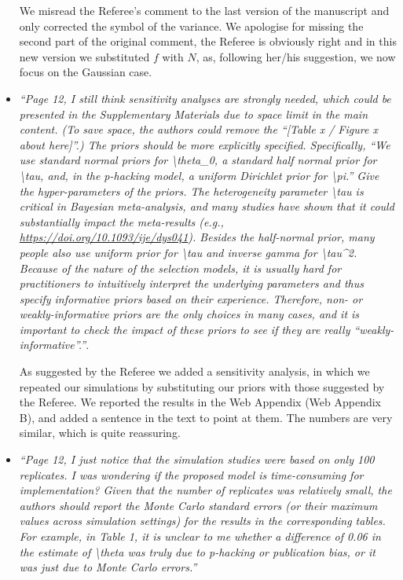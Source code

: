 \documentclass[11pt]{article}
\begin{document}
\begin{itemize}
We misread the Referee's comment to the last version of the manuscript and only corrected the symbol of the variance. We apologise for missing the second part of the original comment, the Referee is obviously right and in this new version we substituted $f$ with $N$, as, following her/his suggestion, we now focus on the Gaussian case.\\


\item \emph{``Page 12, I still think sensitivity analyses are strongly needed, which could be presented in the Supplementary Materials due to space limit in the main content. (To save space, the authors could remove the ``[Table x / Figure x about here]''.) The priors should be more explicitly specified. Specifically, ``We use standard normal priors for \textbackslash theta\_0, a standard half normal prior for \textbackslash tau, and, in the p-hacking model, a uniform Dirichlet prior for \textbackslash pi.'' Give the hyper-parameters of the priors. The heterogeneity parameter \textbackslash tau is critical in Bayesian meta-analysis, and many studies have shown that it could substantially impact the meta-results (e.g., \url{https://doi.org/10.1093/ije/dys041}). Besides the half-normal prior, many people also use uniform prior for \textbackslash tau and inverse gamma for \textbackslash tau\^{}2. Because of the nature of the selection models, it is usually hard for practitioners to intuitively interpret the underlying parameters and thus specify informative priors based on their experience. Therefore, non- or weakly-informative priors are the only choices in many cases, and it is important to check the impact of these priors to see if they are really ``weakly-informative''.''}.

As suggested by the Referee we added a sensitivity analysis, in which we repeated our simulations by substituting our priors with those suggested by the Referee. We reported the results in the Web Appendix (Web Appendix B), and added a sentence in the text to point at them. The numbers are very similar, which is quite reassuring.\\


\item \emph{``Page 12, I just notice that the simulation studies were based on only 100 replicates. I was wondering if the proposed model is time-consuming for implementation? Given that the number of replicates was relatively small, the authors should report the Monte Carlo standard errors (or their maximum values across simulation settings) for the results in the corresponding tables. For example, in Table 1, it is unclear to me whether a difference of 0.06 in the estimate of \textbackslash theta was truly due to p-hacking or publication bias, or it was just due to Monte Carlo errors.''}


\end{itemize}
\end{document}
